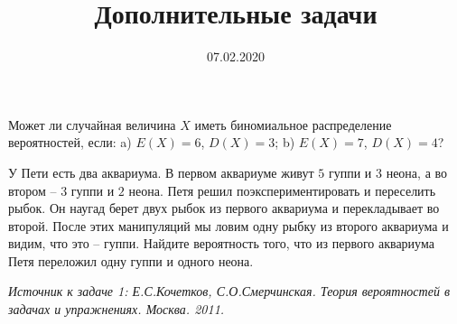 \documentclass[a4paper, 12pt]{article}
\title{Дополнительные задачи}
\date{07.02.2020}
\begin{document}
\begin{problem}
Может ли случайная величина $X$ иметь биномиальное распределение вероятностей, если:
a) $E(X) = 6$, $D(X) =3$; b)  $E(X) = 7$, $D(X) =4$?
\end{problem}

\begin{problem}
У Пети есть два аквариума. В первом аквариуме живут $5$ гуппи и $3$ неона, 
а во втором – $3$ гуппи и $2$ неона. Петя решил поэкспериментировать и 
переселить рыбок. Он наугад берет двух рыбок из первого аквариума 
и перекладывает во второй. После этих манипуляций мы ловим одну
рыбку из второго аквариума и видим, что это – гуппи. Найдите
вероятность того, что из первого аквариума Петя переложил одну гуппи 
и одного неона.
\end{problem}

\noindent\textit{Источник к задаче 1: Е.С.Кочетков, С.О.Смерчинская. Теория вероятностей в задачах и упражнениях. Москва. 2011.}
\end{document}
